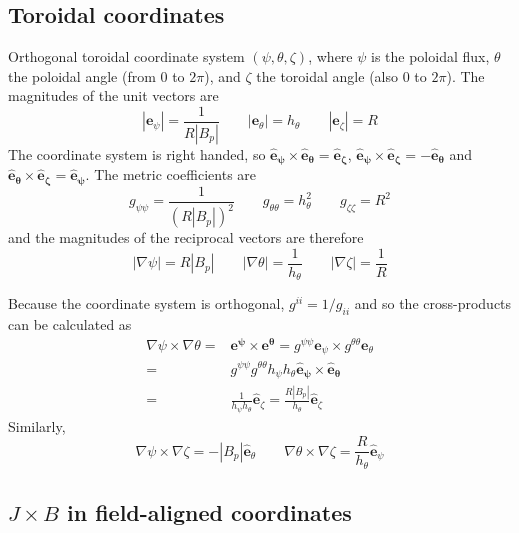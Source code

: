 \documentclass[12pt, a4paper]{article}
\begin{document}
\subsection{Toroidal coordinates}

Orthogonal toroidal coordinate system $\left(\psi, \theta, \zeta\right)$, 
where $\psi$ is the poloidal flux, $\theta$ the poloidal angle
(from $0$ to $2\pi$), and $\zeta$ the toroidal angle (also $0$ to $2\pi$).
The magnitudes of the unit vectors are
\begin{equation}
\left|\mathbf{e}_\psi\right| = \frac{1}{R\left|B_p\right|} \qquad
\left|\mathbf{e}_\theta\right| = h_\theta \qquad
\left|\mathbf{e}_\zeta\right| = R
\label{eq:fluxmags}
\end{equation}
The coordinate system is right handed, so $\mathbf{\hat{e}_\psi\times\hat{e}_\theta = \hat{e}_\zeta}$,
$\mathbf{\hat{e}_\psi\times\hat{e}_\zeta = -\hat{e}_\theta}$ and $\mathbf{\hat{e}_\theta\times\hat{e}_\zeta = \hat{e}_\psi}$. The metric coefficients are
\begin{equation}
g_{\psi\psi} = \frac{1}{\left(R\left|B_p\right|\right)^2} \qquad
g_{\theta\theta} = h_\theta^2 \qquad
g_{\zeta\zeta} = R^2
\end{equation}
and the magnitudes of the reciprocal vectors are therefore
\begin{equation}
\left|\nabla\psi\right| = R\left|B_p\right| \qquad
\left|\nabla\theta\right| = \frac{1}{h_\theta} \qquad
\left|\nabla\zeta\right| = \frac{1}{R}
\label{eq:fluxmags2}
\end{equation}

Because the coordinate system is orthogonal, $g^{ii} = 1/g_{ii}$ and so the cross-products can be calculated as
\begin{eqnarray*}
\nabla\psi\times\nabla\theta = &\mathbf{e^\psi\times e^\theta} = 
g^{\psi\psi}\mathbf{e}_\psi\times g^{\theta\theta}\mathbf{e}_\theta \nonumber \\
= & g^{\psi\psi}g^{\theta\theta}h_\psi h_\theta\mathbf{\hat{e}_\psi\times\hat{e}_\theta} \nonumber \\
= &\frac{1}{h_\psi h_\theta}\mathbf{\hat{e}}_\zeta 
= \frac{R\left|B_p\right|}{h_\theta}\mathbf{\hat{e}}_\zeta
\end{eqnarray*}
Similarly, 
\[
\nabla\psi\times\nabla\zeta = -\left|B_p\right|\mathbf{\hat{e}}_\theta \qquad
\nabla\theta\times\nabla\zeta = \frac{R}{h_\theta}\mathbf{\hat{e}}_\psi
\]

\subsection{$J\times B$ in field-aligned coordinates}
\label{sec:jxb_fac}
\end{document}
